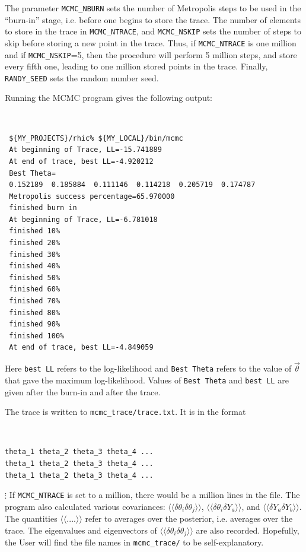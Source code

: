 \documentclass[UserManual.tex]{subfiles}
\begin{document}
The parameter {\tt MCMC\_NBURN} sets the number of Metropolis steps to be used in the ``burn-in'' stage, i.e. before one begins to store the trace. The number of elements to store in the trace in {\tt MCMC\_NTRACE}, and {\tt MCMC\_NSKIP} sets the number of steps to skip before storing a new point in the trace. Thus, if {\tt MCMC\_NTRACE} is one million and if {\tt MCMC\_NSKIP}=5, then the procedure will perform 5 million steps, and store every fifth one, leading to one million stored points in the trace. Finally, {\tt RANDY\_SEED} sets the random number seed. 

Running the MCMC program gives the following output:
{\tt
\begin{verbatim}
 ${MY_PROJECTS}/rhic% ${MY_LOCAL}/bin/mcmc
 At beginning of Trace, LL=-15.741889
 At end of trace, best LL=-4.920212
 Best Theta=
 0.152189  0.185884  0.111146  0.114218  0.205719  0.174787  
 Metropolis success percentage=65.970000
 finished burn in
 At beginning of Trace, LL=-6.781018
 finished 10%
 finished 20%
 finished 30%
 finished 40%
 finished 50%
 finished 60%
 finished 70%
 finished 80%
 finished 90%
 finished 100%
 At end of trace, best LL=-4.849059
\end{verbatim}}
Here {\tt best LL} refers to the log-likelihood and {\tt Best Theta} refers to the value of $\vec{\theta}$ that gave the maximum log-likelihood. Values of {\tt Best Theta} and {\tt best LL} are given after the burn-in and after the trace. 

The trace is written to {\tt mcmc\_trace/trace.txt}. It is in the format 
{\tt
\begin{verbatim}
theta_1	theta_2 theta_3 theta_4 ...
theta_1	theta_2 theta_3 theta_4 ...
theta_1	theta_2 theta_3 theta_4 ...
\end{verbatim}}
\vspace*{-18pt}\hspace*{82pt}$\vdots$
If {\tt MCMC\_NTRACE} is set to a million, there would be a million lines in the file. The program also calculated various covariances:
$\langle\langle\delta\theta_i\delta\theta_j\rangle\rangle$,  $\langle\langle\delta\theta_i\delta Y_a\rangle\rangle$, and $\langle\langle\delta Y_a\delta Y_b\rangle\rangle$. The quantities $\langle\langle....\rangle\rangle$ refer to averages over the  posterior, i.e. averages over the trace. The eigenvalues and eigenvectors of $\langle\langle\delta\theta_i\delta\theta_j\rangle\rangle$ are also recorded. Hopefully, the User will find the file names in {\tt mcmc\_trace/} to be self-explanatory.
\end{document}
